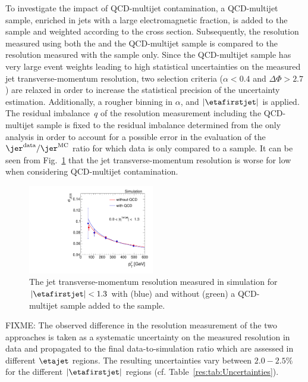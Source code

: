 To investigate the impact of QCD-multijet contamination, a QCD-multijet sample, enriched in jets with a large electromagnetic fraction, is added to the \GAMJET sample and weighted according to the cross section.
Subsequently, the resolution measured using both the \GAMJET and the QCD-multijet sample is compared to the resolution measured with the \GAMJET sample only.
Since the QCD-multijet sample has very large event weights leading to high statistical uncertainties on the measured jet transverse-momentum resolution, two selection criteria ($\alpha<0.4$ and $\Delta\Phi>2.7$) are relaxed in order to increase the statistical precision of the uncertainty estimation.
Additionally, a rougher binning in $\alpha$, \ptgamma and $|\etafirstjet|$ is applied.
The residual imbalance~$q$ of the resolution measurement including the QCD-multijet sample is fixed to the residual imbalance determined from the \GAMJET only analysis in order to account for a possible error in the evaluation of the $\jer^{\text{data}}/\jer^{\text{MC}}$ ratio for which data is only compared to a \GAMJET sample.
It can be seen from Fig.~\ref{res:fig:QCDuncertainty} that the jet transverse-momentum resolution is worse for low \ptgamma when considering QCD-multijet contamination.
\begin{figure}[!b]
  \centering
      \includegraphics[width=0.49\textwidth]{figures/resolution/systematicUncertainties/Resolution_for_1_eta_bin_QCDUncertainty_RMS99.pdf}
  \caption{The jet transverse-momentum resolution measured in simulation for $|\etafirstjet| < 1.3$ with (blue) and without (green) a QCD-multijet sample added to the \GAMJET sample.}  
  \label{res:fig:QCDuncertainty}
\end{figure}

FIXME: The observed difference in the resolution measurement of the two approaches is taken as a systematic uncertainty on the measured resolution in data and propagated to the final data-to-simulation ratio which are assessed in different $\etajet$ regions.
The resulting uncertainties vary between $2.0-2.5\%$ for the different $|\etafirstjet|$ regions (cf. Table~\ref{res:tab:Uncertainties}).

